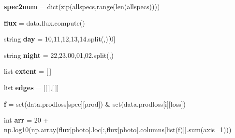 \begin{DoxyCompactItemize}
\mbox{\label{namespacez__infomap__revert_aeffcf8e78f15807b94556b5ffb793828}} 
{\bfseries spec2num} = dict(zip(allspecs,range(len(allspecs))))
\item 
\mbox{\label{namespacez__infomap__revert_af21b623980bf60bfd13a88cdbc982be1}} 
{\bfseries flux} = data.\+flux.\+compute()
\item 
\mbox{\label{namespacez__infomap__revert_a9d5cc2e7c214ff1f76e97aa6c7a86fec}} 
string {\bfseries day} = \textquotesingle{}10,11,12,13,14\textquotesingle{}.split(\textquotesingle{},\textquotesingle{})\mbox{[}0\mbox{]}
\item 
\mbox{\label{namespacez__infomap__revert_a57043f45d2f159db61584f5eb2bcb015}} 
string {\bfseries night} = \textquotesingle{}22,23,00,01,02\textquotesingle{}.split(\textquotesingle{},\textquotesingle{})
\item 
\mbox{\label{namespacez__infomap__revert_a5b4c2437f892c1b8c2875054e8fc2651}} 
list {\bfseries extent} = \mbox{[}$\,$\mbox{]}
\item 
\mbox{\label{namespacez__infomap__revert_abc98b3b7c69f731db8fcfbd88a53e142}} 
list {\bfseries edges} = \mbox{[}\mbox{[}$\,$\mbox{]},\mbox{[}$\,$\mbox{]}\mbox{]}
\item 
\mbox{\label{namespacez__infomap__revert_a6a39a4b44d75a619b7fc3500f5847066}} 
{\bfseries f} = set(data.\+prodloss\mbox{[}spec\mbox{]}\mbox{[}\textquotesingle{}prod\textquotesingle{}\mbox{]}) \& set(data.\+prodloss\mbox{[}i\mbox{]}\mbox{[}\textquotesingle{}loss\textquotesingle{}\mbox{]})
\item 
\mbox{\label{namespacez__infomap__revert_adcd1f246be4c115b2c3ce73eec71abaf}} 
int {\bfseries arr} = 20 + np.\+log10(np.\+array(flux\mbox{[}photo\mbox{]}.loc\mbox{[}\+:,flux\mbox{[}photo\mbox{]}.columns\mbox{[}list(f)\mbox{]}\mbox{]}.sum(axis=1)))
\item 
\mbox{\label{namespacez__infomap__revert_a08f83e40e2f7a35e99c6328f8e0a4bf9}} 

\end{DoxyCompactItemize}
